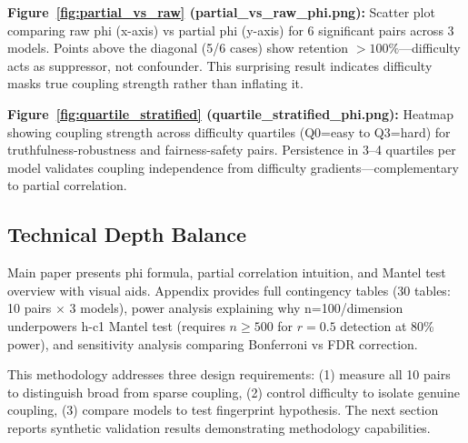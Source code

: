 \textbf{Figure~\ref{fig:partial_vs_raw} (partial\_vs\_raw\_phi.png):} Scatter plot comparing raw phi (x-axis) vs partial phi (y-axis) for 6 significant pairs across 3 models. Points above the diagonal (5/6 cases) show retention $>100\%$---difficulty acts as suppressor, not confounder. This surprising result indicates difficulty masks true coupling strength rather than inflating it.

\textbf{Figure~\ref{fig:quartile_stratified} (quartile\_stratified\_phi.png):} Heatmap showing coupling strength across difficulty quartiles (Q0=easy to Q3=hard) for truthfulness-robustness and fairness-safety pairs. Persistence in 3--4 quartiles per model validates coupling independence from difficulty gradients---complementary to partial correlation.

\subsection{Technical Depth Balance}

Main paper presents phi formula, partial correlation intuition, and Mantel test overview with visual aids. Appendix provides full contingency tables (30 tables: 10 pairs $\times$ 3 models), power analysis explaining why n=100/dimension underpowers h-c1 Mantel test (requires $n \geq 500$ for $r=0.5$ detection at 80\% power), and sensitivity analysis comparing Bonferroni vs FDR correction.

This methodology addresses three design requirements: (1) measure all 10 pairs to distinguish broad from sparse coupling, (2) control difficulty to isolate genuine coupling, (3) compare models to test fingerprint hypothesis. The next section reports synthetic validation results demonstrating methodology capabilities.
